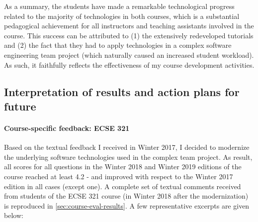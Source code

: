 

As a summary, the students have made a remarkable technological progress related to the majority of technologies in both 
courses, which is a substantial pedagogical achievement for all instructors and teaching assistants involved in the course. 
This success can be attributed to (1) the extensively redeveloped tutorials and (2) the fact that they had to apply 
technologies in a complex software engineering team project (which naturally caused an increased student workload).  As 
such, it faithfully reflects the effectiveness of my course development activities. 

\subsection{Interpretation of results and action plans for future}

\paragraph{Course-specific feedback: ECSE 321}
Based on the textual feedback I received in Winter 2017, I decided to modernize the underlying software technologies used in the complex team project. As result, all scores for all questions in the Winter 2018 and Winter 2019 editions of the course reached at least 4.2 - and improved with respect to the Winter 2017 edition in all cases (except one). 
A complete set of textual comments received from students of the ECSE 321 course (in Winter 2018 after the modernization) is reproduced in \autoref{sec:course-eval-results}. A few representative excerpts are given below:

